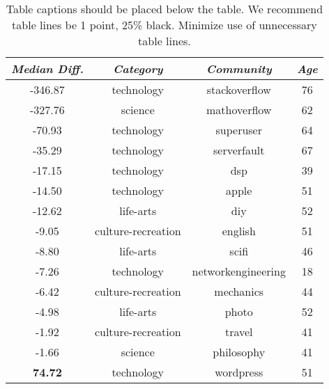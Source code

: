 \begin{table}[h]
\centering
\begin{tabular}{@{}cccc@{}}
\toprule
{\small\textit{Median Diff.}} & {\small \textit{Category}} & {\small \textit{Community}} & {\small \textit{Age  }} \\ \midrule
-346.87                            & technology         & stackoverflow      & 76                 \\ \midrule
-327.76                           & science            & mathoverflow       & 62                 \\ \midrule
-70.93                            & technology         & superuser          & 64                 \\ \midrule
-35.29                            & technology         & serverfault        & 67                 \\ \midrule
-17.15                            & technology         & dsp                & 39                 \\ \midrule
-14.50                            & technology         & apple              & 51                 \\ \midrule
-12.62                            & life-arts          & diy                & 52                 \\ \midrule
-9.05                             & culture-recreation & english            & 51                 \\ \midrule
-8.80                             & life-arts          & scifi              & 46                 \\ \midrule
-7.26                             & technology         & networkengineering & 18                 \\ \midrule
-6.42                             & culture-recreation & mechanics          & 44                 \\ \midrule
-4.98                             & life-arts          & photo              & 52                 \\ \midrule
-1.92                             & culture-recreation & travel             & 41                 \\ \midrule
-1.66                             & science            & philosophy         & 41                 \\ \midrule
\textbf{74.72}                             & technology         & wordpress          & 51                 \\ \bottomrule
\end{tabular}
\caption{Table captions should be placed below the table. We recommend table lines be 1 point, 25\% black. Minimize use of unnecessary table lines.}~\label{table:lifetime}
\end{table}



